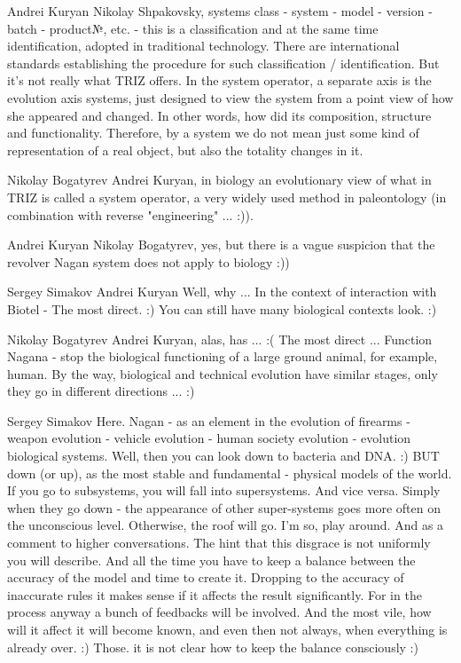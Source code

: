 \documentclass[11pt,a4paper]{article}
\begin{document}
Andrei Kuryan Nikolay Shpakovsky, systems class - system - model - version -
batch - product№, etc. - this is a classification and at the same time
identification, adopted in traditional technology. There are international
standards establishing the procedure for such classification /
identification. But it’s not really what TRIZ offers. In the system operator,
a separate axis is the evolution axis systems, just designed to view the
system from a point view of how she appeared and changed. In other words, how
did its composition, structure and functionality. Therefore, by a system we do
not mean just some kind of representation of a real object, but also the
totality changes in it.

Nikolay Bogatyrev Andrei Kuryan, in biology an evolutionary view of what in
TRIZ is called a system operator, a very widely used method in paleontology
(in combination with reverse "engineering" ... :)).

Andrei Kuryan Nikolay Bogatyrev, yes, but there is a vague suspicion that the
revolver Nagan system does not apply to biology :))

Sergey Simakov Andrei Kuryan Well, why ... In the context of interaction with
Biotel - The most direct. :) You can still have many biological contexts
look. :)

Nikolay Bogatyrev Andrei Kuryan, alas, has ... :( The most direct ... Function
Nagana - stop the biological functioning of a large ground animal, for
example, human. By the way, biological and technical evolution have similar
stages, only they go in different directions ... :)

Sergey Simakov Here. Nagan - as an element in the evolution of firearms -
weapon evolution - vehicle evolution - human society evolution - evolution
biological systems. Well, then you can look down to bacteria and DNA. :) BUT
down (or up), as the most stable and fundamental - physical models of the
world. If you go to subsystems, you will fall into supersystems. And vice
versa. Simply when they go down - the appearance of other super-systems goes
more often on the unconscious level. Otherwise, the roof will go. I'm so, play
around. And as a comment to higher conversations. The hint that this disgrace
is not uniformly you will describe. And all the time you have to keep a
balance between the accuracy of the model and time to create it. Dropping to
the accuracy of inaccurate rules it makes sense if it affects the result
significantly. For in the process anyway a bunch of feedbacks will be
involved. And the most vile, how will it affect it will become known, and even
then not always, when everything is already over. :) Those. it is not clear
how to keep the balance consciously :)
\end{document}

